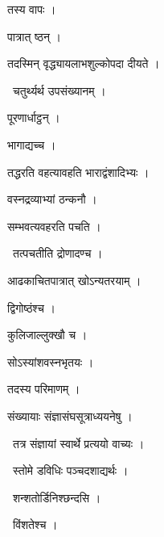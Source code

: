 \documentclass[10pt, openany, oneside]{book}
\begin{document}
\noindent तस्य वापः ।

\noindent पात्रात् ष्ठन् ।

\noindent तदस्मिन् वृद्ध्यायलाभशुल्कोपदा दीयते ।

\par\noindent\hspace{1.5em}{\vps वा॰}~{\qt चतुर्थ्यर्थ उपसंख्यानम् ।}

\noindent पूरणार्धाट्ठन् ।

\noindent भागाद्यच्च ।

\noindent तद्धरति वहत्यावहति भाराद्वंशादिभ्यः ।

\noindent वस्नद्रव्याभ्यां ठन्कनौ ।

\noindent सम्भवत्यवहरति पचति ।

\par\noindent\hspace{1.5em}{\vps वा॰}~{\qt तत्पचतीति द्रोणादण्च ।}

\noindent आढकाचितपात्रात् खोऽन्यतरयाम् ।

\noindent द्विगोष्ठंश्च ।

\noindent कुलिजाल्लुक्खौ च ।

\noindent सोऽस्यांशवस्नभृतयः ।

\noindent तदस्य परिमाणम् ।

\noindent संख्यायाः संज्ञासंघसूत्राध्ययनेषु ।

\par\noindent\hspace{1.5em}{\vps वा॰}~{\qt तत्र संज्ञायां स्वार्थे प्रत्ययो वाच्यः ।}

\par\noindent\hspace{1.5em}{\vps वा॰}~{\qt स्तोमे डविधिः पञ्चदशाद्यर्थः ।}

\par\noindent\hspace{1.5em}{\vps वा॰}~{\qt शन्शतोर्डिनिश्छन्दसि ।}

\par\noindent\hspace{1.5em}{\vps वा॰}~{\qt विंशतेश्च ।}
\end{document}
